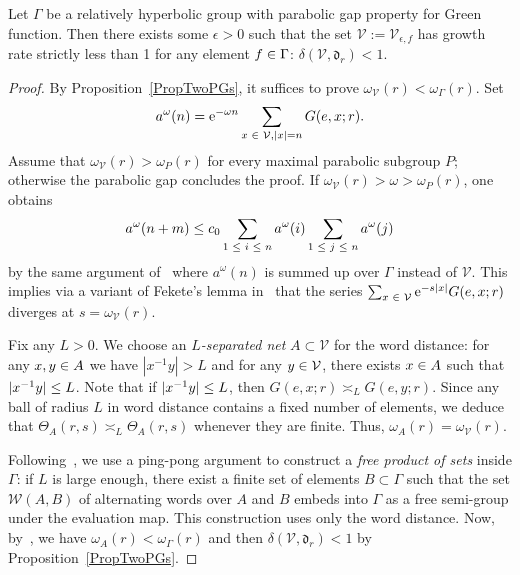 \documentclass[AHL,Unicode,longabstracts]{cedram}
\makeatletter
\newcommand{\rme}{\mathrm{e}}
\newcommand{\fkd}{\mathfrak{d}}
\newcommand{\clV}{\mathcal{V}}
\newcommand{\clW}{\mathcal{W}}
\let\save@mathaccent\mathaccent
\newcommand*\if@single[3]{%
  \setbox0\hbox{${\mathaccent"0362{#1}}^H$}%
  \setbox2\hbox{${\mathaccent"0362{\kern0pt#1}}^H$}%
  \ifdim\ht0=\ht2 #3\else #2\fi
  }
\newcommand*\rel@kern[1]{\kern#1\dimexpr\macc@kerna}
\newcommand*\widebar[1]{\@ifnextchar^{{\wide@bar{#1}{0}}}{\wide@bar{#1}{1}}}
\newcommand*\wide@bar[2]{\if@single{#1}{\wide@bar@{#1}{#2}{1}}{\wide@bar@{#1}{#2}{2}}}
\newcommand*\wide@bar@[3]{%
  \begingroup
  \def\mathaccent##1##2{%
    \let\mathaccent\save@mathaccent
    \if#32 \let\macc@nucleus\first@char \fi
    \setbox\z@\hbox{$\macc@style{\macc@nucleus}_{}$}%
    \setbox\tw@\hbox{$\macc@style{\macc@nucleus}{}_{}$}%
    \dimen@\wd\tw@
    \advance\dimen@-\wd\z@
    \divide\dimen@ 3
    \@tempdima\wd\tw@
    \advance\@tempdima-\scriptspace
    \divide\@tempdima 10
    \advance\dimen@-\@tempdima
    \ifdim\dimen@>\z@ \dimen@0pt\fi
    \rel@kern{0.6}\kern-\dimen@
    \if#31
      \overline{\rel@kern{-0.6}\kern\dimen@\macc@nucleus\rel@kern{0.4}\kern\dimen@}%
      \advance\dimen@0.4\dimexpr\macc@kerna
      \let\final@kern#2%
      \ifdim\dimen@<\z@ \let\final@kern1\fi
      \if\final@kern1 \kern-\dimen@\fi
    \else
      \overline{\rel@kern{-0.6}\kern\dimen@#1}%
    \fi
  }%
  \macc@depth\@ne
  \let\math@bgroup\@empty \let\math@egroup\macc@set@skewchar
  \mathsurround\z@ \frozen@everymath{\mathgroup\macc@group\relax}%
  \macc@set@skewchar\relax
  \let\mathaccentV\macc@nested@a
  \if#31
    \macc@nested@a\relax111{#1}%
  \else
    \def\gobble@till@marker##1\endmarker{}%
    \futurelet\first@char\gobble@till@marker#1\endmarker
    \ifcat\noexpand\first@char A\else
      \def\first@char{}%
    \fi
    \macc@nested@a\relax111{\first@char}%
  \fi
  \endgroup
}
\let\oldbar\bar
\renewcommand*{\bar}[1]{{\mathchoice{\widebar{#1}}{\widebar{#1}}{\widebar{#1}}{\oldbar{#1}}}}
\let\oldin\in
\renewcommand{\in}{\mathchoice{\oldin}{\oldin}{\,\oldin\,}{\,\oldin\,}}
\let\oldle\le
\renewcommand{\le}{\mathchoice{\oldle}{\oldle}{\,\oldle\,}{\,\oldle\,}}
\makeatother
\begin{document}
\begin{lemm}\label{BarrierFreeLem}
Let $\Gamma$ be a relatively hyperbolic group with parabolic gap property for Green function. Then there exists some $\epsilon>0$ such that the set $\clV:=\clV_{\epsilon, f}$ has growth rate strictly less than 1 for any element $f\in \Gamma$: $\delta(\clV, \fkd_r)<1$.
\end{lemm}
\begin{proof}
By Proposition~\ref{PropTwoPGs}, it suffices to prove $\omega_{\clV}(r)<\omega_{\Gamma}(r)$. Set
\[
a^\omega(n) = \rme^{-\omega n}\sum_{x\in \clV, |x|=n} G(e,x;r).
\]
Assume that $\omega_{\clV}(r) >\omega_P(r)$ for every maximal parabolic subgroup $P$; otherwise the parabolic gap concludes the proof. If $\omega_{\clV}(r)>\omega >\omega_P(r)$, one obtains
\[
a^\omega(n+m) \le c_0 \sum_{1\le i\le n} a^\omega(i) \sum_{1\le j\le n} a^\omega(j)
\]
by the same argument of~\cite[Lemma~3.7]{DWY} where $a^\omega(n)$ is summed up over $\Gamma$ instead of $\clV$. This implies via a variant of Fekete's lemma in~\cite[Lemma~4.3]{DPPS} that the series $\sum_{x\in \clV} \rme^{-s |x|}G(e,x;r)$ diverges at $s=\omega_{\clV}(r)$.

Fix any $L>0$. We choose an \emph{$L$-separated net} $A\subset \clV$ for the word distance: for any $x, y\in A$ we have $|x^{-1}y|>L$ and for any $y\in \clV$, there exists $x\in A$ such that $|x^{-1}y|\le L$. Note that if $|x^{-1}y|\le L$, then $G(e, x;r)\asymp_L G(e,y;r)$. Since any ball of radius $L$ in word distance contains a fixed number of elements, we deduce that $\Theta_A(r, s)\asymp_L \Theta_A(r, s)$ whenever they are finite. Thus, $\omega_A(r)=\omega_{\clV}(r)$.

Following~\cite[Section~4.2]{YangSCC}, we use a ping-pong argument to construct a \emph{free product of sets} inside $\Gamma$: if $L$ is large enough, there exist a finite set of elements $B\subset \Gamma$ such that the set $\clW(A, B)$ of alternating words over $A$ and $B$ embeds into $\Gamma$ as a free semi-group under the evaluation map. This construction uses only the word distance. Now, by~\cite[Lemma~3.8]{DWY}, we have $\omega_A(r)<\omega_\Gamma(r)$ and then $\delta(\clV, \fkd_r)<1$ by Proposition~\ref{PropTwoPGs}.
\end{proof}

\end{document}
